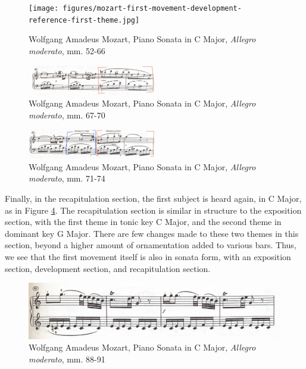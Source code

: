 \begin{figure}[h]
    \centering
    \texttt{[image: figures/mozart-first-movement-development-reference-first-theme.jpg]}
    \caption{Wolfgang Amadeus Mozart, Piano Sonata in C Major, \textit{Allegro moderato}, mm. 52-66}
    \label{fig:mozart-first-movement-development-reference-first-theme}
\end{figure}

\begin{figure}
    \centering
    \includegraphics[width=0.5\textwidth]{figures/mozart-first-movement-modulation-a-major.jpg}
    \caption{Wolfgang Amadeus Mozart, Piano Sonata in C Major, \textit{Allegro moderato}, mm. 67-70}
    \label{fig:mozart-first-movement-modulation-a-major}
\end{figure}

\begin{figure}
    \centering
\includegraphics[width=0.5\textwidth]{figures/mozart-first-movement-f-major-d-minor.jpg}
    \caption{Wolfgang Amadeus Mozart, Piano Sonata in C Major, \textit{Allegro moderato}, mm. 71-74}
    \label{fig:mozart-first-movement-f-major-d-minor}
\end{figure}

Finally, in the recapitulation section, the first subject is heard again, in C Major, as in Figure \ref{fig:mozart-first-movement-recapitulation-first-theme}\autocite{Henle_1977}. The recapitulation section is similar in structure to the exposition section, with the first theme in tonic key C Major, and the second theme in dominant key G Major. There are few changes made to these two themes in this section, beyond a higher amount of ornamentation added to various bars. Thus, we see that the first movement itself is also in sonata form, with an exposition section, development section, and recapitulation section.

\begin{figure}[h]
    \centering
    \includegraphics[width=\textwidth]{figures/mozart-first-movement-recapitulation-first-theme.jpg}
    \caption{Wolfgang Amadeus Mozart, Piano Sonata in C Major, \textit{Allegro moderato}, mm. 88-91}
    \label{fig:mozart-first-movement-recapitulation-first-theme}
\end{figure}

